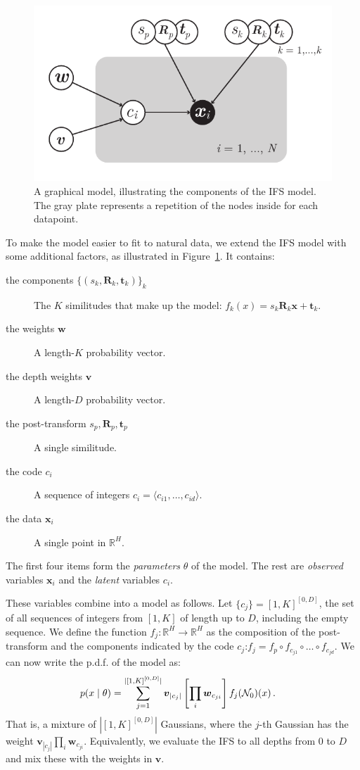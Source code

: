 \documentclass[reprint,amsmath,amssymb,aps,prl]{revtex4-1}
\newcommand{\p}{\mbox{\,.}}
\newcommand{\R}{\mathbb{R}}
\newcommand{\cN}{{\cal N}}
\newcommand{\bx}{\boldsymbol x}
\newcommand{\bt}{\boldsymbol t}
\newcommand{\bR}{\boldsymbol R}
\newcommand{\bw}{\boldsymbol w}
\newcommand{\bv}{\boldsymbol v}
\begin{document}
\begin{figure}[t]
  \center
  \includegraphics[width=\linewidth]{../img/factor-graph.pdf}
  \caption{A graphical model, illustrating the components of the IFS model. The gray plate represents a repetition of the nodes inside for each datapoint.}
  \label{figure:ifs-diagram}
\end{figure}

To make the model easier to fit to natural data, we extend the IFS model with some additional factors, as illustrated in Figure~\ref{figure:ifs-diagram}. It contains:
\begin{description}
\item[the components $\{(s_k, \bR_k, \bt_k)\}_k$] The $K$ similitudes that make up the model: $f_k(x) = s_k\bR_k\bx + \bt_k$.
\item[the weights $\bw$] A length-$K$ probability vector. 
\item[the depth weights $\bv$] A length-$D$ probability vector.
\item[the post-transform $s_p, \bR_p, \bt_p$] A single similitude.
\item[the code $c_i$] A sequence of integers $c_i = \langle c_{i1}, \ldots, c_{id} \rangle$.
\item[the data $\bx_i$] A single point in $\R^H$.
\end{description}
The first four items form the \emph{parameters} $\theta$ of the model. The rest are \emph{observed} variables $\bx_i$ and the \emph{latent} variables $c_i$.  

These variables combine into a model as follows. Let $\{c_j\} = [1, K]^{[0, D]}$, the set of all sequences of integers from $[1, K]$ of length up to $D$, including the empty sequence. We define the function $f_j:\R^H \to \R^H$ as the composition of the post-transform and the components indicated by the code $c_j$:$f_j = f_p \circ f_{c_{j1}} \circ \ldots \circ f_{c_{jd}}$. We can now write the p.d.f. of the model as:
\begin{align*}
p(x\mid \theta) &= \sum_{j=1}^{|[1, K]^{[0, D]}|} \bv_{|c_j|} \left[\prod_i \bw_{c_{ji}}\right ] f_j(\cN_0)(x) \p
\end{align*}
That is, a mixture of $|[1, K]^{[0, D]}|$ Gaussians, where the $j$-th Gaussian has the weight $\bv_{|c_j|} \prod_i \bw_{c_{ji}}$. Equivalently, we evaluate the IFS to all depths from $0$ to $D$ and mix these with the weights in $\bv$.
\end{document}
